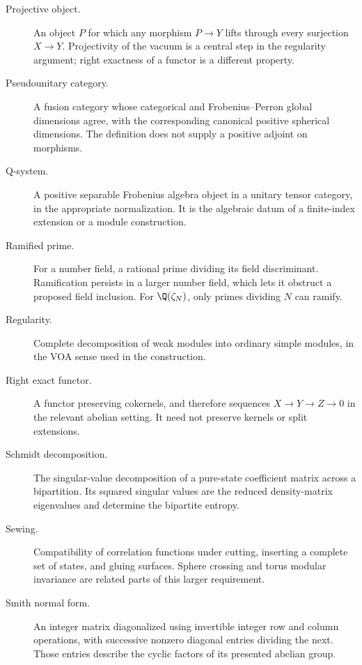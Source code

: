 \begin{description}
\item[Projective object.]An object $P$ for which any morphism
$P\to Y$ lifts through every surjection $X\to Y$.
Projectivity of the vacuum is a central step in the
regularity argument; right exactness of a functor is a
different property.

\item[Pseudounitary category.]A fusion category whose
categorical and Frobenius--Perron global dimensions agree,
with the corresponding canonical positive spherical dimensions.
The definition does not supply a positive adjoint on morphisms.

\item[Q-system.]A positive separable Frobenius algebra object in a
unitary tensor category, in the appropriate normalization. It is
the algebraic datum of a finite-index extension or a module
construction.

\item[Ramified prime.]For a number field, a rational prime
dividing its field discriminant. Ramification persists in a larger
number field, which lets it obstruct a proposed field inclusion.
For $\Q(\zeta_N)$, only primes dividing $N$ can ramify.

\item[Regularity.]Complete decomposition of weak modules into
ordinary simple modules, in the VOA sense used in the construction.

\item[Right exact functor.]A functor preserving cokernels,
and therefore sequences $X\to Y\to Z\to0$ in the relevant
abelian setting. It need not preserve kernels or split extensions.

\item[Schmidt decomposition.]The singular-value decomposition
of a pure-state coefficient matrix across a bipartition.
Its squared singular values are the reduced density-matrix
eigenvalues and determine the bipartite entropy.

\item[Sewing.]Compatibility of correlation functions under cutting,
inserting a complete set of states, and gluing surfaces. Sphere
crossing and torus modular invariance are related parts of this
larger requirement.

\item[Smith normal form.]An integer matrix diagonalized using
invertible integer row and column operations, with successive
nonzero diagonal entries dividing the next. Those entries
describe the cyclic factors of its presented abelian group.


\end{description}
